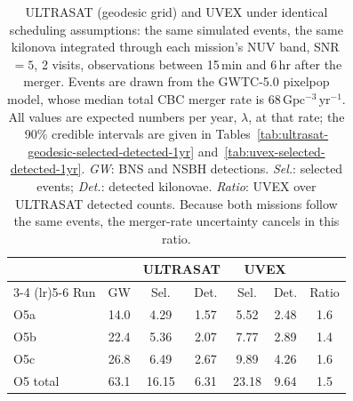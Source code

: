 \begin{table}[!htb]
\centering
\renewcommand\arraystretch{1.15}
\setlength{\tabcolsep}{0.14cm}
\caption{ULTRASAT (geodesic grid) and UVEX under identical scheduling
assumptions: the same simulated events, the same kilonova integrated through
each mission's NUV band, SNR\,$=5$, 2 visits, observations between
15\,min and 6\,hr after the merger. Events are
drawn from the GWTC-5.0 pixelpop model, whose median total CBC merger rate is
68\,$\mathrm{Gpc^{-3}\,yr^{-1}}$. All values are expected numbers
per year, $\lambda$, at that rate; the 90\% credible intervals are given in
Tables~\ref{tab:ultrasat-geodesic-selected-detected-1yr}
and~\ref{tab:uvex-selected-detected-1yr}. \emph{GW}: BNS and NSBH detections.
\emph{Sel.}: selected events; \emph{Det.}: detected kilonovae.
\emph{Ratio}: UVEX over ULTRASAT detected counts. Because both missions follow
the same events, the merger-rate uncertainty cancels in this ratio.}
\label{tab:mission-comparison}
\begin{tabular}{lcccccc}
\toprule
 & & \multicolumn{2}{c}{ULTRASAT} & \multicolumn{2}{c}{UVEX} & \\
\cmidrule(lr){3-4} \cmidrule(lr){5-6}
Run & GW & Sel. & Det. & Sel. & Det. & Ratio \\
\midrule
O5a & 14.0 & 4.29 & 1.57 & 5.52 & 2.48 & 1.6 \\
O5b & 22.4 & 5.36 & 2.07 & 7.77 & 2.89 & 1.4 \\
O5c & 26.8 & 6.49 & 2.67 & 9.89 & 4.26 & 1.6 \\
\midrule
O5 total & 63.1 & 16.15 & 6.31 & 23.18 & 9.64 & 1.5 \\
\bottomrule
\end{tabular}
\end{table}
